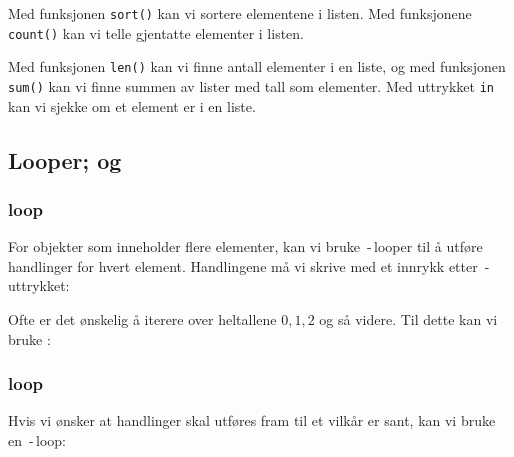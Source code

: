 Med funksjonen \texttt{sort()} kan vi sortere elementene i listen.
\vsk
\newpage
Med funksjonene \texttt{count()} kan vi telle gjentatte elementer i listen.
 \vsk

Med funksjonen \texttt{len()} kan vi finne antall elementer i en liste, og med funksjonen \texttt{sum()} kan vi finne summen av lister med tall som elementer.
\newpage
Med uttrykket \texttt{in} kan vi sjekke om et element er i en liste.


\newpage
\subsection{Looper;  og }
\subsubsection{ loop}
For objekter som inneholder flere elementer, kan vi bruke \,-\,looper til å utføre handlinger for hvert element. Handlingene må vi skrive med et innrykk etter \,-\,uttrykket:
\vsk

Ofte er det ønskelig å iterere over heltallene $ 0, 1, 2 $ og så videre. Til dette kan vi bruke :
\subsubsection{ loop}
Hvis vi ønsker at handlinger skal utføres fram til et vilkår er sant, kan vi bruke en \,-\,loop: \regv
{}

